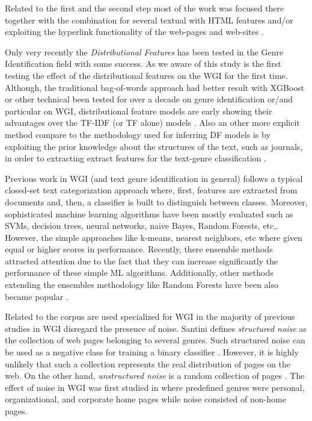 \documentclass[runningheads]{llncs}
\begin{document}
Related to the first and the second step most of the work was focused there together with the combination for several textual with HTML features and/or exploiting the hyperlink functionality of the web-pages and web-sites \citep{zhu2011enhance,abramson2012_URL,jebari2014pure_URL,priyatam2013don_URL,asheghi2014semi}.

Only very recently the \textit{Distributional Features} has been tested in the Genre Identification field with some success. As we aware of this study is the first testing the effect of the distributional features on the WGI for the first time.  Although, the traditional bag-of-words approach had better result with XGBoost or other technical been tested for over a decade on genre identification or/and particular on WGI, distributional feature models are early showing their advantages over the TF-IDF (or TF alone) models \cite{worsham2018genre}. Also an other more explicit method compare to the methodology used for inferring DF models is by exploiting the prior knowledge about the structures of the text, such as journals, in order to extracting extract features for the text-genre classification \cite{dai2018fine}.

Previous work in WGI (and text genre identification in general) follows a typical closed-set text categorization approach where, first, features are extracted from documents and, then, a classifier is built to distinguish between classes. Moreover, sophisticated machine learning algorithms have been mostly evaluated such as SVMs, decision trees, neural networks, naive Bayes, Random Forests, etc,\citep{Lim2005,santini2007automatic,kanaris2009learning,jebari2015combination,sharoff2010web}. However, the simple approaches like k-means, nearest neighbors, etc where given equal or higher scores in performance. Recently, there ensemble methods attracted attention due to the fact that they can increase significantly the performance of these simple ML algorithms. Additionally, other methods extending the ensembles methodology like Random Forests have been also became popular \cite{onan2018ensemble}.

Related to the corpus are used specialized for WGI in the majority of previous studies in WGI disregard the presence of noise. Santini \citep{santini2011cross} defines \textit{structured noise} as the collection of web pages belonging to several genres. Such structured noise can be used as a negative class for training a binary classifier \citep{Vidulin2007}. However, it is highly unlikely that such a collection represents the real distribution of pages on the web. On the other hand, \textit{unstructured noise} is a random collection of pages \citep{santini2011cross}. The effect of noise in WGI was first studied in \citep{shepherd2004cybergenre,kennedy2005automatic,dong2006binary,levering2008using} where predefined genres were personal, organizational, and corporate home pages while noise consisted of non-home pages.
\end{document}
